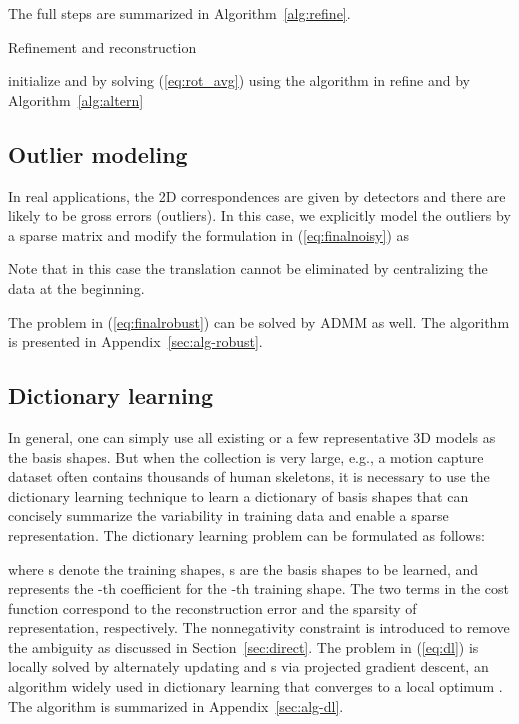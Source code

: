 \documentclass[10pt,journal,cspaper,compsoc]{IEEEtran}
\newcommand{\refEq}[1]{(\ref{#1})}
\newcommand{\refSec}[1]{Section~\ref{#1}}
\newcommand{\refAlg}[1]{Algorithm~\ref{#1}}
\newcommand{\refApp}[1]{Appendix~\ref{#1}}
\begin{document}
The full steps are summarized in \refAlg{alg:refine}.

\begin{algorithm}\label{alg:refine}
\LinesNumbered
\caption{Refinement and reconstruction}
\KwIn{}
\KwOut{}
\vspace{0.5em}
initialize  and  by solving \refEq{eq:rot_avg} using the algorithm in \cite[Section 4.4.1]{del2012bilinear}\;
\vspace{0.25em}
refine  and  by \refAlg{alg:altern}\;
\vspace{0.25em}
\;
\vspace{0.5em}
\end{algorithm}
\vspace{-1em}

\subsection{Outlier modeling}\label{sec:outliers}

In real applications, the 2D correspondences are given by detectors and there are likely to be gross errors (outliers). In this case, we explicitly model the outliers by a sparse matrix  and modify the formulation in \refEq{eq:finalnoisy} as

Note that in this case the translation  cannot be eliminated by centralizing the data at the beginning.

The problem in \refEq{eq:finalrobust} can be solved by ADMM as well. The algorithm is presented in \refApp{sec:alg-robust}.

\subsection{Dictionary learning}\label{sec:dl}

In general, one can simply use all existing or a few representative 3D models as the basis shapes. But when the collection is very large, e.g., a motion capture dataset often contains thousands of human skeletons, it is necessary to use the dictionary learning technique to learn a dictionary of basis shapes that can concisely summarize the variability in training data and enable a sparse representation. The dictionary learning problem can be formulated as follows:

where s denote the training shapes, s are the basis shapes to be learned, and  represents the -th coefficient for the -th training shape. The two terms in the cost function correspond to the reconstruction error and the sparsity of representation, respectively. The nonnegativity constraint is introduced to remove the ambiguity as discussed in \refSec{sec:direct}. The problem in \refEq{eq:dl} is locally solved by alternately updating  and s via projected gradient descent, an algorithm widely used in dictionary learning that converges to a local optimum \cite{mairal2010online}. The algorithm is summarized in \refApp{sec:alg-dl}.
\end{document}
